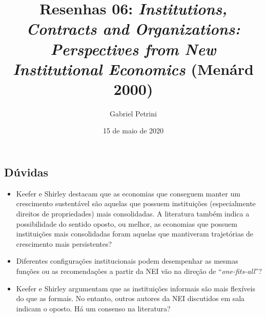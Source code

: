 \documentclass[9pt,twocolumn,twoside,lineno]{style}
\title{Resenhas 06: \textit{Institutions, Contracts and Organizations: Perspectives from New Institutional Economics} (Menárd 2000)}
\date{15 de maio de  2020}
\author[$\ddagger$]{Gabriel Petrini}
\affil[$\ddagger$]{Doutorando no instituto de Economia da Unicamp}
\begin{document}
\maketitle\articletypemark
\marginmark
\thispagestyle{firststyle}




\begin{sigstatement}
	\sffamily
	{%
		\begin{mdframed}[style=stylesigstyle]%
			\section*{Dúvidas}%
			\begin{itemize}
				\item Keefer e Shirley destacam que as economias que conseguem manter um crescimento sustentável são aquelas que possuem instituições (especialmente direitos de propriedades) mais consolidadas. A literatura também indica a possibilidade do sentido oposto, ou melhor, as economias que possuem instituições mais consolidadas foram aquelas que mantiveram trajetórias de crescimento mais persistentes?
				\item Diferentes configurações institucionais podem desempenhar as mesmas funções ou as recomendações a partir da NEI vão na direção de ``\textit{one-fits-all}''?
				\item Keefer e Shirley argumentam que as instituições informais são mais flexíveis do que as formais. No entanto, outros autores da NEI discutidos em sala indicam o oposto. Há um consenso na literatura?
			\end{itemize}
			
			
	\end{mdframed}}
\end{sigstatement}
	
\end{document}

